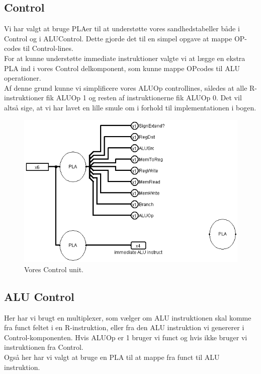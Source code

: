 \documentclass [10pt,a4paper]{article}
\begin{document}
\subsection*{Control}
Vi har valgt at bruge PLAer til at understøtte vores sandhedstabeller
både i Control og i ALUControl. Dette gjorde det til en simpel opgave
at mappe OP-codes til Control-lines.\\
For at kunne understøtte immediate instruktioner valgte vi at lægge en
ekstra PLA ind i vores Control delkomponent, som kunne mappe OPcodes
til ALU operationer. \\
Af denne grund kunne vi simplificere vores ALUOp controllines, således
at alle R-instruktioner fik ALUOp 1 og resten af instruktionerne fik
ALUOp 0. Det vil altså sige, at vi har lavet en lille smule om i
forhold til implementationen i bogen.

\begin{figure}[h!]
  \centering  
    \includegraphics[scale=0.7]{control.png}
  \caption{Vores Control unit.}
\end{figure}

\subsection*{ALU Control}
Her har vi brugt en multiplexer, som vælger om ALU instruktionen skal
komme fra funct feltet i en R-instruktion, eller fra den ALU
instruktion vi genererer i Control-komponenten. Hvis ALUOp er 1 bruger
vi funct og hvis ikke bruger vi instruktionen fra Control.\\
Også her har vi valgt at bruge en PLA til at mappe fra funct til ALU
instruktion.
\end{document}
